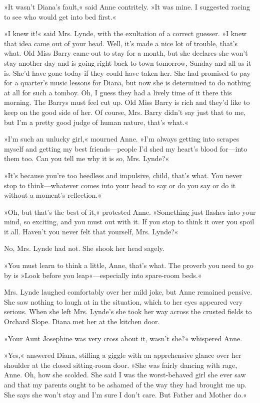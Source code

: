 »It wasn't Diana's fault,« said Anne contritely. »It was mine. I suggested racing to see who would get into bed first.«

»I knew it!« said Mrs. Lynde, with the exultation of a correct guesser. »I knew that idea came out of your head. Well, it's made a nice lot of trouble, that's what. Old Miss Barry came out to stay for a month, but she declares she won't stay another day and is going right back to town tomorrow, Sunday and all as it is. She'd have gone today if they could have taken her. She had promised to pay for a quarter's music lessons for Diana, but now she is determined to do nothing at all for such a tomboy. Oh, I guess they had a lively time of it there this morning. The Barrys must feel cut up. Old Miss Barry is rich and they'd like to keep on the good side of her. Of course, Mrs. Barry didn't say just that to me, but I'm a pretty good judge of human nature, that's what.«

»I'm such an unlucky girl,« mourned Anne. »I'm always getting into scrapes myself and getting my best friends—people I'd shed my heart's blood for—into them too. Can you tell me why it is so, Mrs. Lynde?«

»It's because you're too heedless and impulsive, child, that's what. You never stop to think—whatever comes into your head to say or do you say or do it without a moment's reflection.«

»Oh, but that's the best of it,« protested Anne. »Something just flashes into your mind, so exciting, and you must out with it. If you stop to think it over you spoil it all. Haven't you never felt that yourself, Mrs. Lynde?«

No, Mrs. Lynde had not. She shook her head sagely.

»You must learn to think a little, Anne, that's what. The proverb you need to go by is »Look before you leap«—especially into spare-room beds.«

Mrs. Lynde laughed comfortably over her mild joke, but Anne remained pensive. She saw nothing to laugh at in the situation, which to her eyes appeared very serious. When she left Mrs. Lynde's she took her way across the crusted fields to Orchard Slope. Diana met her at the kitchen door.

»Your Aunt Josephine was very cross about it, wasn't she?« whispered Anne.

»Yes,« answered Diana, stifling a giggle with an apprehensive glance over her shoulder at the closed sitting-room door. »She was fairly dancing with rage, Anne. Oh, how she scolded. She said I was the worst-behaved girl she ever saw and that my parents ought to be ashamed of the way they had brought me up. She says she won't stay and I'm sure I don't care. But Father and Mother do.«


